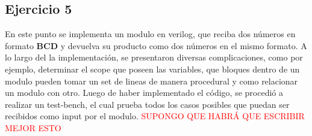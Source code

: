 \documentclass[a4paper]{article}
\begin{document}
\subsection*{Ejercicio 5}
En este punto se implementa un modulo en verilog, que reciba dos números en formato \textbf{BCD} y devuelva su producto como dos números en el mismo formato.
A lo largo del la implementación, se presentaron diversas complicaciones, como por ejemplo, determinar el scope que poseen las variables, que bloques dentro de un modulo pueden tomar un set de lineas de manera procedural y como relacionar un modulo con otro.
Luego de haber implementado el código, se procedió a realizar un test-bench, el cual prueba todos los casos posibles que puedan ser recibidos como input por el modulo.
\center \textcolor{red}{SUPONGO QUE HABRÁ QUE ESCRIBIR MEJOR ESTO}
\end{document}
